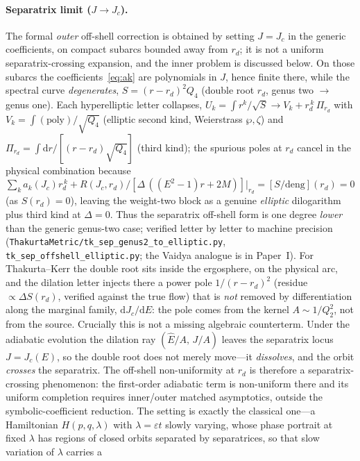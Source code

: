 \documentclass[12pt]{iopart}
\theoremstyle{plain}
\theoremstyle{definition}
\theoremstyle{remark}
\newcommand{\Ehat}{\hat E}
\newcommand{\Jc}{J_{c}}
\newcommand{\dd}{\mathrm{d}}
\begin{document}
\paragraph{Separatrix limit ($J\to\Jc$).} The formal \emph{outer} off-shell correction
is obtained by setting $J=\Jc$ in the generic coefficients, on compact subarcs bounded
away from $r_d$; it is not a uniform separatrix-crossing expansion, and the
inner problem is discussed below. On those subarcs
the coefficients~\eqref{eq:ak} are polynomials in $J$, hence
finite there, while the spectral curve \emph{degenerates}, $S=(r-r_d)^2Q_4$ (double root
$r_d$, genus two $\to$ genus one). Each hyperelliptic letter collapses,
$U_k=\int r^k/\sqrt S\to V_k+r_d^{\,k}\,\Pi_{r_d}$ with $V_k=\int(\text{poly})/\sqrt{Q_4}$
(elliptic second kind, Weierstrass $\wp,\zeta$) and $\Pi_{r_d}=\int\dd r/[(r-r_d)\sqrt{Q_4}]$
(third kind); the spurious poles at $r_d$ cancel in the physical combination because
$\sum_k a_k(\Jc)r_d^{\,k}+R(\Jc,r_d)/[\Delta\,((E^2-1)r+2M)]|_{r_d}=[S/\text{deng}](r_d)=0$
(as $S(r_d)=0$), leaving the weight-two block as a genuine \emph{elliptic}
dilogarithm~\cite{BeilinsonLevin1994,BrownLevin2011} plus third kind at $\Delta=0$. Thus
the separatrix off-shell form is one degree \emph{lower} than the generic genus-two case;
verified letter by letter to machine precision (\texttt{ThakurtaMetric/tk\_sep\_genus2\_to\_elliptic.py},
\texttt{tk\_sep\_offshell\_elliptic.py}; the Vaidya analogue is in Paper~I).
For Thakurta--Kerr the double root sits inside the ergosphere, on the physical arc, and
the dilation letter injects there a power pole $1/(r-r_d)^2$ (residue
$\propto\Delta S(r_d)$, verified against the true flow) that is \emph{not} removed by
differentiation along the marginal family, $\dd J_c/\dd E$: the pole comes from the kernel $A\sim1/Q_2^2$, not
from the source. Crucially this is not a missing algebraic counterterm. Under the
adiabatic evolution the dilation ray $(\Ehat/A,\,J/A)$ leaves the separatrix locus
$J=J_c(E)$, so the double root does not merely move---it \emph{dissolves}, and the orbit
\emph{crosses} the separatrix. The off-shell non-uniformity at $r_d$ is therefore a
separatrix-crossing phenomenon: the first-order
adiabatic term is non-uniform there and its uniform completion requires inner/outer
matched asymptotics, outside the symbolic-coefficient reduction. The setting is
exactly the classical one---a Hamiltonian $H(p,q,\lambda)$ with $\lambda=\varepsilon
t$ slowly varying, whose phase portrait at fixed $\lambda$ has regions of closed
orbits separated by separatrices, so that slow variation of $\lambda$ carries a
\end{document}
